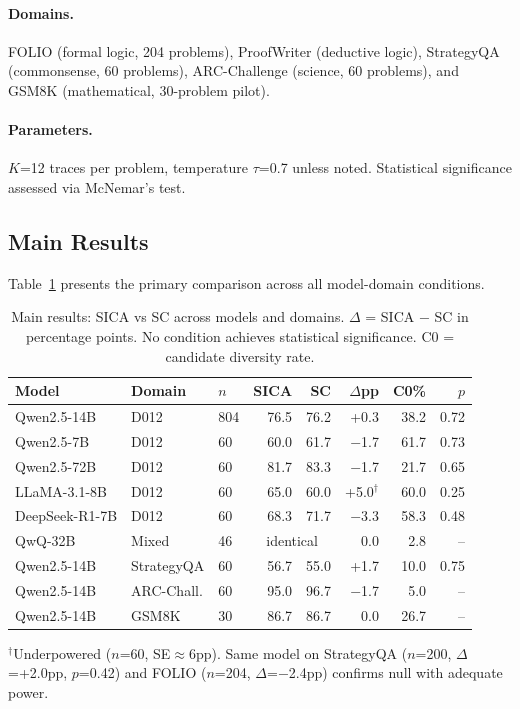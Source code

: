 \documentclass[11pt,a4paper]{article}
\begin{document}
\paragraph{Domains.} FOLIO (formal logic, 204 problems), ProofWriter (deductive logic), StrategyQA (commonsense, 60 problems), ARC-Challenge (science, 60 problems), and GSM8K (mathematical, 30-problem pilot).

\paragraph{Parameters.} $K$=12 traces per problem, temperature $\tau$=0.7 unless noted. Statistical significance assessed via McNemar's test.

\subsection{Main Results}

Table~\ref{tab:main} presents the primary comparison across all model-domain conditions.

\begin{table}[t]
\centering
\small
\caption{Main results: SICA vs SC across models and domains. $\Delta$ = SICA $-$ SC in percentage points. No condition achieves statistical significance. C0 = candidate diversity rate.}
\label{tab:main}
\begin{tabular}{lllrrrrr}
\toprule
Model & Domain & $n$ & SICA & SC & $\Delta$pp & C0\% & $p$ \\
\midrule
Qwen2.5-14B & D012 & 804 & 76.5 & 76.2 & +0.3 & 38.2 & 0.72 \\
Qwen2.5-7B & D012 & 60 & 60.0 & 61.7 & $-$1.7 & 61.7 & 0.73 \\
Qwen2.5-72B & D012 & 60 & 81.7 & 83.3 & $-$1.7 & 21.7 & 0.65 \\
LLaMA-3.1-8B & D012 & 60 & 65.0 & 60.0 & +5.0$^\dagger$ & 60.0 & 0.25 \\
DeepSeek-R1-7B & D012 & 60 & 68.3 & 71.7 & $-$3.3 & 58.3 & 0.48 \\
\midrule
QwQ-32B & Mixed & 46 & \multicolumn{2}{c}{identical} & 0.0 & 2.8 & -- \\
\midrule
Qwen2.5-14B & StrategyQA & 60 & 56.7 & 55.0 & +1.7 & 10.0 & 0.75 \\
Qwen2.5-14B & ARC-Chall. & 60 & 95.0 & 96.7 & $-$1.7 & 5.0 & -- \\
Qwen2.5-14B & GSM8K & 30 & 86.7 & 86.7 & 0.0 & 26.7 & -- \\
\bottomrule
\end{tabular}
\vspace{2pt}
\raggedright\footnotesize{$^\dagger$Underpowered ($n$=60, SE$\approx$6pp). Same model on StrategyQA ($n$=200, $\Delta$=+2.0pp, $p$=0.42) and FOLIO ($n$=204, $\Delta$=$-$2.4pp) confirms null with adequate power.}
\end{table}
\end{document}
